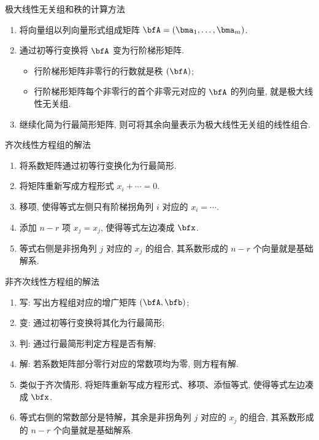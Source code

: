 \documentclass[aspectratio=169,handout]{ctexbeamer}
\let\rank\relax\DeclareMathOperator\rank{R}
\begin{document}
\begin{frame}{极大线性无关组和秩的计算方法}
	\onslide<+->
	\begin{enumerate}
		\item 将向量组以列向量形式组成矩阵 $\bfA=(\bma_1,\dots,\bma_m)$.
		\item 通过初等行变换将 $\bfA$ 变为行阶梯形矩阵.
			\begin{itemize}
				\item 行阶梯形矩阵非零行的行数就是秩 $\rank(\bfA)$;
				\item 行阶梯形矩阵每个非零行的首个非零元对应的 $\bfA$ 的列向量, 就是极大线性无关组.
			\end{itemize}
		\item 继续化简为行最简形矩阵, 则可将其余向量表示为极大线性无关组的线性组合.
	\end{enumerate}
\end{frame}



\begin{frame}{齐次线性方程组的解法}
	\onslide<+->
	\begin{enumerate}
		\item 将系数矩阵通过初等行变换化为行最简形.
		\item 将矩阵重新写成方程形式 $x_i+\cdots=0$.
		\item 移项, 使得等式左侧只有阶梯拐角列 $i$ 对应的 $x_i=\cdots$.
		\item 添加 $n-r$ 项 $x_j=x_j$, 使得等式左边凑成 $\bfx$.
		\item 等式右侧是非拐角列 $j$ 对应的 $x_j$ 的组合, 其系数形成的 $n-r$ 个向量就是基础解系.
	\end{enumerate}
\end{frame}



\begin{frame}{非齐次线性方程组的解法}
	\onslide<+->
	\begin{enumerate}
		\item 写: 写出方程组对应的增广矩阵 $(\bfA,\bfb)$;
		\item 变: 通过初等行变换将其化为行最简形;
		\item 判: 通过行最简形判定方程是否有解;
		\item 解: 若系数矩阵部分零行对应的常数项均为零, 则方程有解.
		\item 类似于齐次情形, 将矩阵重新写成方程形式、移项、添恒等式, 使得等式左边凑成 $\bfx$.
		\item 等式右侧的常数部分是特解，其余是非拐角列 $j$ 对应的 $x_j$ 的组合, 其系数形成的 $n-r$ 个向量就是基础解系.
	\end{enumerate}
\end{frame}
\end{document}
